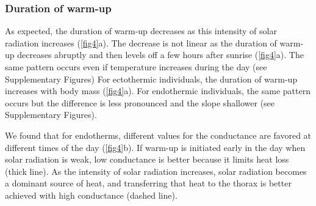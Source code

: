 \subsubsection*{Duration of warm-up}
As expected, the duration of warm-up decreases as this intensity of solar radiation increases (\cref{fig4}a).
The decrease is not linear as the duration of  warm-up decreases abruptly and then levels off a few hours after sunrise (\cref{fig4}a).
The same pattern occurs even if temperature increases during the day (see Supplementary Figures)
For ectothermic individuals, the duration of warm-up increases with body mass (\cref{fig4}a).
For endothermic individuals, the same pattern occurs but the difference is less pronounced and the slope shallower (see Supplementary Figures).

We found that for endotherms, different values for the conductance are favored at different times of the day (\cref{fig4}b).
If warm-up is initiated early in the day when solar radiation is weak, low conductance is better because it limits heat loss (thick line).
As the intensity of solar radiation increases, solar radiation becomes a dominant source of heat, and transferring that heat to the thorax is better achieved with high conductance (dashed line).

